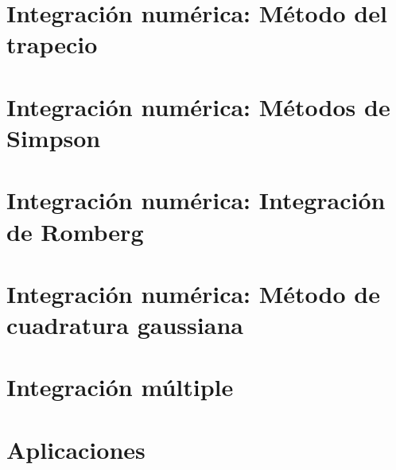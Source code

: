 \section{Integración numérica: Método del trapecio}
\section{Integración numérica: Métodos de Simpson}
\section{Integración numérica: Integración de Romberg}
\section{Integración numérica: Método de cuadratura gaussiana}
\section{Integración múltiple}
\section{Aplicaciones}


